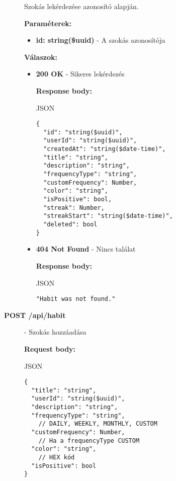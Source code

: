 \documentclass[12pt]{report}
\begin{document}
\begin{description}
  \vspace{0.5cm}
  Szokás lekérdezése azonosító alapján.

  \vspace{0.5cm}
  \textbf{Paraméterek:}
  \begin{itemize}
    \item \textbf{id: string(\$uuid)} - A szokás azonosítója
  \end{itemize}

  \vspace{0.5cm}
  \textbf{Válaszok:}
  \begin{itemize}
    \item \textbf{200 OK} - Sikeres lekérdezés

      \textbf{Response body:}
      \begin{codeblock}{JSON}
        \begin{verbatim}
{
  "id": "string($uuid)",
  "userId": "string($uuid)",
  "createdAt": "string($date-time)",
  "title": "string",
  "description": "string",
  "frequencyType": "string",
  "customFrequency": Number,
  "color": "string",
  "isPositive": bool,
  "streak": Number,
  "streakStart": "string($date-time)",
  "deleted": bool
}
        \end{verbatim}
      \end{codeblock}

    \item \textbf{404 Not Found} - Nincs találat

      \textbf{Response body:}
      \begin{codeblock}{JSON}
        \begin{verbatim}
"Habit was not found."
        \end{verbatim}
      \end{codeblock}
  \end{itemize}

  \item[\textbf{POST /api/habit}] - Szokás hozzáadása
  
    \vspace{0.5cm}
    \textbf{Request body:}
    \begin{codeblock}{JSON}
      \begin{verbatim}
{
  "title": "string",
  "userId": "string($uuid)",
  "description": "string",
  "frequencyType": "string",
    // DAILY, WEEKLY, MONTHLY, CUSTOM
  "customFrequency": Number,
    // Ha a frequencyType CUSTOM
  "color": "string",
    // HEX kód
  "isPositive": bool
}
      \end{verbatim}
    \end{codeblock}


\end{description}
\end{document}
